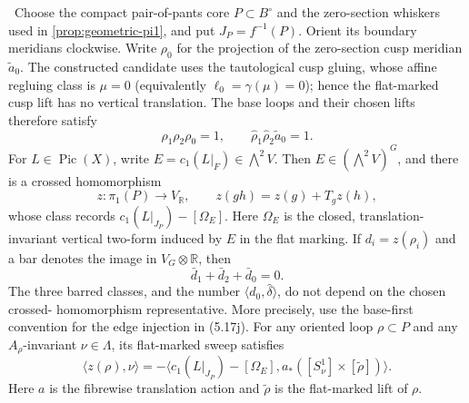 \begin{lemma}
\label{lem:picard-crossed-defect}
\Verified\ Choose the compact pair-of-pants core $P\subset B^\circ$ and
the zero-section whiskers used in \cref{prop:geometric-pi1}, and put
$J_P=f^{-1}(P)$.  Orient its boundary meridians clockwise.  Write
$\rho_0$ for the projection of the zero-section cusp meridian
$\widetilde a_0$.  The constructed candidate uses the tautological cusp
gluing, whose affine regluing class is $\mu=0$ (equivalently
$\ell_0=\gamma(\mu)=0$); hence the flat-marked cusp lift has no vertical
translation.  The base loops and their chosen lifts therefore satisfy
\[
 \rho_1\rho_2\rho_0=1,
 \qquad
 \widehat\rho_1\widehat\rho_2\widetilde a_0=1.
\tag{5.17g}
\]
For $L\in\operatorname{Pic}(X)$, write
$E=c_1(L|_F)\in\bigwedge^2V$.  Then $E\in(\bigwedge^2V)^G$, and there is a
crossed homomorphism
\[
 z:\pi_1(P)\longrightarrow V_{\mathbb R},\qquad
 z(gh)=z(g)+T_gz(h),
\tag{5.17h}
\]
whose class records
$c_1(L|_{J_P})-[\Omega_E]$.  Here $\Omega_E$ is the closed, translation-
invariant vertical two-form induced by $E$ in the flat marking.  If
$d_i=z(\rho_i)$ and a bar denotes the image in
$V_G\otimes\mathbb R$, then
\[
 \bar d_1+\bar d_2+\bar d_0=0.
\tag{5.17i}
\]
The three barred classes, and the number
$\langle d_0,\widehat\delta\rangle$, do not depend on the chosen crossed-
homomorphism representative.  More precisely, use the base-first convention
for the edge injection in (5.17j).  For any oriented loop $\rho\subset P$
and any $A_\rho$-invariant $\nu\in\Lambda$, its flat-marked sweep satisfies
\[
 \bigl\langle z(\rho),\nu\bigr\rangle
 =-\bigl\langle c_1(L|_{J_P})-[\Omega_E],
 a_*([S^1_\nu]\times[\widetilde\rho])\bigr\rangle.
\tag{5.17j'}
\]
Here $a$ is the fibrewise translation action and $\widetilde\rho$ is the
flat-marked lift of $\rho$.
\end{lemma}

